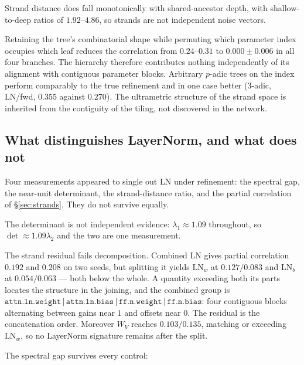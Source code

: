 Strand distance does fall monotonically with shared-ancestor depth, with
shallow-to-deep ratios of $1.92$--$4.86$, so strands are not independent noise
vectors.

\begin{proposition}
Retaining the tree's combinatorial shape while permuting which parameter index
occupies which leaf reduces the correlation from $0.24$--$0.31$ to
$0.000 \pm 0.006$ in all four branches. The hierarchy therefore contributes
nothing independently of its alignment with contiguous parameter blocks.
Arbitrary $p$-adic trees on the index perform comparably to the true refinement
and in one case better ($3$-adic, LN/fwd, $0.355$ against $0.270$). The
ultrametric structure of the strand space is inherited from the contiguity of
the tiling, not discovered in the network.
\end{proposition}

\subsection{What distinguishes LayerNorm, and what does not}
\label{sec:ln-status}

Four measurements appeared to single out $\mathrm{LN}$ under refinement: the
spectral gap, the near-unit determinant, the strand-distance ratio, and the
partial correlation of \S\ref{sec:strands}. They do not survive equally.

The determinant is not independent evidence: $\lambda_1 \approx 1.09$
throughout, so $\det \approx 1.09\lambda_2$ and the two are one measurement.

The strand residual fails decomposition. Combined $\mathrm{LN}$ gives partial
correlation $0.192$ and $0.208$ on two seeds, but splitting it yields
$\mathrm{LN}_w$ at $0.127/0.083$ and $\mathrm{LN}_b$ at $0.054/0.063$ --- both
below the whole. A quantity exceeding both its parts locates the structure in
the joining, and the combined group is
$\mathtt{attn.ln.weight}\,|\,\mathtt{attn.ln.bias}\,|\,\mathtt{ff.n.weight}\,|\,\mathtt{ff.n.bias}$:
four contiguous blocks alternating between gains near $1$ and offsets near $0$.
The residual is the concatenation order. Moreover $W_V$ reaches $0.103/0.135$,
matching or exceeding $\mathrm{LN}_w$, so no LayerNorm signature remains after
the split.

The spectral gap survives every control:

